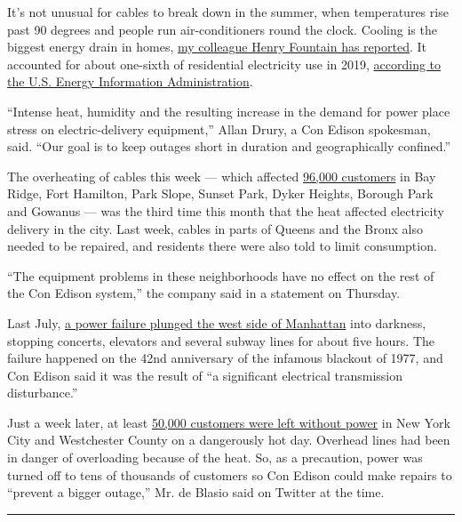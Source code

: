 It's not unusual for cables to break down in the summer, when
temperatures rise past 90 degrees and people run air-conditioners round
the clock. Cooling is the biggest energy drain in homes,
\href{https://www.nytimes3xbfgragh.onion/2020/04/29/climate/nyt-climate-newsletter-energy-bill.html}{my
colleague Henry Fountain has reported}. It accounted for about one-sixth
of residential electricity use in 2019,
\href{https://www.eia.gov/tools/faqs/faq.php?id=96\&t=3}{according to
the U.S. Energy Information Administration}.

``Intense heat, humidity and the resulting increase in the demand for
power place stress on electric-delivery equipment,'' Allan Drury, a Con
Edison spokesman, said. ``Our goal is to keep outages short in duration
and geographically confined.''

The overheating of cables this week --- which affected
\href{https://www.coned.com/en/about-us/media-center/news/20200730/con-edison-asks-customers-in-area-of-brooklyn-to-conserve-energy}{96,000
customers} in Bay Ridge, Fort Hamilton, Park Slope, Sunset Park, Dyker
Heights, Borough Park and Gowanus --- was the third time this month that
the heat affected electricity delivery in the city. Last week, cables in
parts of Queens and the Bronx also needed to be repaired, and residents
there were also told to limit consumption.

``The equipment problems in these neighborhoods have no effect on the
rest of the Con Edison system,'' the company said in a statement on
Thursday.

Last July,
\href{https://www.nytimes3xbfgragh.onion/2019/07/13/nyregion/nyc-power-outage.html}{a
power failure plunged the west side of Manhattan} into darkness,
stopping concerts, elevators and several subway lines for about five
hours. The failure happened on the 42nd anniversary of the infamous
blackout of 1977, and Con Edison said it was the result of ``a
significant electrical transmission disturbance.''

Just a week later, at least
\href{https://www.nytimes3xbfgragh.onion/2019/07/21/nyregion/nyc-heat-wave.html}{50,000
customers were left without power} in New York City and Westchester
County on a dangerously hot day. Overhead lines had been in danger of
overloading because of the heat. So, as a precaution, power was turned
off to tens of thousands of customers so Con Edison could make repairs
to ``prevent a bigger outage,'' Mr. de Blasio said on Twitter at the
time.

\begin{center}\rule{0.5\linewidth}{\linethickness}\end{center}

